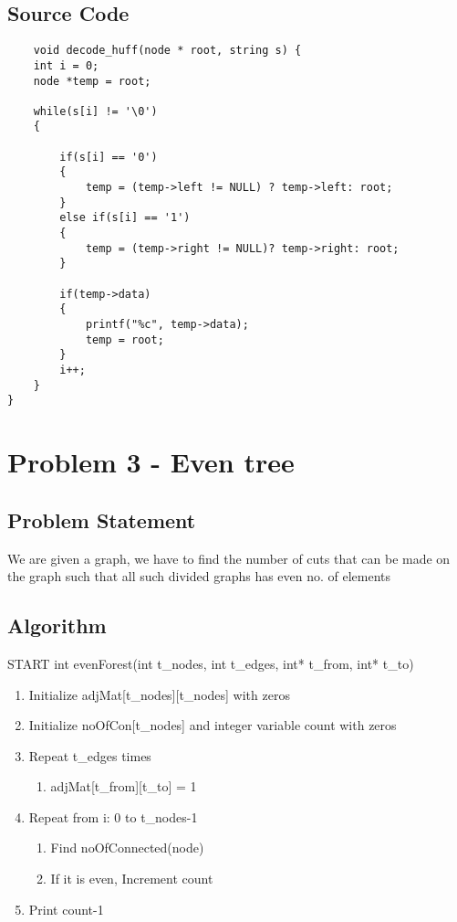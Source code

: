 \documentclass{article}
\begin{document}
\subsection{Source Code}
\begin{verbatim}
    void decode_huff(node * root, string s) {
    int i = 0;
    node *temp = root;
    
    while(s[i] != '\0')
    {
        
        if(s[i] == '0')
        {
            temp = (temp->left != NULL) ? temp->left: root;
        }
        else if(s[i] == '1')
        {
            temp = (temp->right != NULL)? temp->right: root;
        }
        
        if(temp->data)
        {
            printf("%c", temp->data);
            temp = root;
        }
        i++;
    }
}
\end{verbatim}
\newpage
\section{Problem 3 - Even tree}
\subsection{Problem Statement}
We are given a graph, we have to find the number of cuts that can be made on the graph such that all such divided graphs has even no. of elements
\subsection{Algorithm}
START\newline
int evenForest(int t\_nodes, int t\_edges, int* t\_from, int* t\_to)
\newline
\begin{flushleft}
\begin{enumerate}
 \item Initialize adjMat[t\_nodes][t\_nodes] with zeros
 \item Initialize noOfCon[t\_nodes] and integer variable count with zeros
 \item Repeat t\_edges times
\begin{flushleft}
\begin{enumerate}
\item adjMat[t\_from][t\_to] = 1
\end{enumerate}
\end{flushleft}
\item Repeat from i: 0 to t\_nodes-1
\begin{enumerate}
 \item Find noOfConnected(node)
 \item If it is even, Increment count
\end{enumerate}

\item Print count-1
\end{enumerate}
\end{flushleft}
\end{document}
